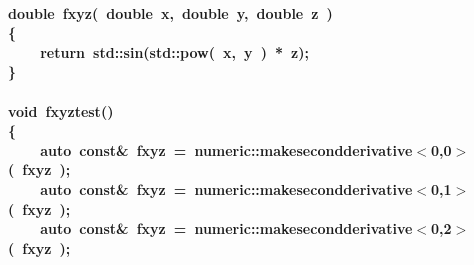 \documentclass[9pt,onside]{article}
\newcommand{\hlstd}[1]{\textcolor[rgb]{0.2,0,0.4}{#1}}
\newcommand{\hlnum}[1]{\textcolor[rgb]{0.2,0.73,0.02}{#1}}
\newcommand{\hlopt}[1]{\textcolor[rgb]{0.33,0.33,0.33}{#1}}
\newcommand{\hlkwa}[1]{\textcolor[rgb]{1,0.19,0.19}{#1}}
\newcommand{\hlkwb}[1]{\textcolor[rgb]{0.96,0.55,0.14}{#1}}
\newcommand{\hlkwc}[1]{\textcolor[rgb]{0,0,1}{#1}}
\newcommand{\hlkwd}[1]{\textcolor[rgb]{0.82,0.11,0.93}{#1}}
\begin{document}
\paragraph{
\hlkwb{double\ }\hlstd{}\hlkwd{fxyz}\hlstd{}\hlopt{(\ }\hlstd{}\hlkwb{double\ }\hlstd{x}\hlopt{,\ }\hlstd{}\hlkwb{double\ }\hlstd{y}\hlopt{,\ }\hlstd{}\hlkwb{double\ }\hlstd{z\ }\hlopt{)}\hspace*{\fill}\\
\hlstd{}\hlopt{\{}\hspace*{\fill}\\
\hlstd{}\hlstd{\ \ \ \ }\hlstd{}\hlkwa{return\ }\hlstd{std}\hlopt{::}\hlstd{}\hlkwd{sin}\hlstd{}\hlopt{(}\hlstd{std}\hlopt{::}\hlstd{}\hlkwd{pow}\hlstd{}\hlopt{(\ }\hlstd{x}\hlopt{,\ }\hlstd{y\ }\hlopt{)\ {*}\ }\hlstd{z}\hlopt{);}\hspace*{\fill}\\
\hlstd{}\hlopt{\}}\hspace*{\fill}\\
\hlstd{}\hspace*{\fill}\\
\hlkwb{void\ }\hlstd{}\hlkwd{fxyz\textunderscore test}\hlstd{}\hlopt{()}\hspace*{\fill}\\
\hlstd{}\hlopt{\{}\hspace*{\fill}\\
\hlstd{}\hlstd{\ \ \ \ }\hlstd{}\hlkwc{auto\ }\hlstd{}\hlkwb{const}\hlstd{}\hlopt{\&\ }\hlstd{fxyz\ }\hlopt{=\ }\hlstd{numeric}\hlopt{::}\hlstd{make\textunderscore second\textunderscore derivative}\hlopt{$<$}\hlstd{}\hlnum{0}\hlstd{}\hlopt{,}\hlstd{}\hlnum{0}\hlstd{}\hlopt{$>$(\ }\hlstd{fxyz\ }\hlopt{);}\hspace*{\fill}\\
\hlstd{}\hlstd{\ \ \ \ }\hlstd{}\hlkwc{auto\ }\hlstd{}\hlkwb{const}\hlstd{}\hlopt{\&\ }\hlstd{fxyz\ }\hlopt{=\ }\hlstd{numeric}\hlopt{::}\hlstd{make\textunderscore second\textunderscore derivative}\hlopt{$<$}\hlstd{}\hlnum{0}\hlstd{}\hlopt{,}\hlstd{}\hlnum{1}\hlstd{}\hlopt{$>$(\ }\hlstd{fxyz\ }\hlopt{);}\hspace*{\fill}\\
\hlstd{}\hlstd{\ \ \ \ }\hlstd{}\hlkwc{auto\ }\hlstd{}\hlkwb{const}\hlstd{}\hlopt{\&\ }\hlstd{fxyz\ }\hlopt{=\ }\hlstd{numeric}\hlopt{::}\hlstd{make\textunderscore second\textunderscore derivative}\hlopt{$<$}\hlstd{}\hlnum{0}\hlstd{}\hlopt{,}\hlstd{}\hlnum{2}\hlstd{}\hlopt{$>$(\ }\hlstd{fxyz\ }\hlopt{);}\hspace*{\fill}\\
}
\end{document}
